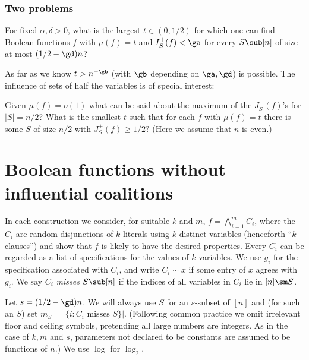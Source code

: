 %
%
%
%
%
%
%
%
%
%
%
%
%
%

%


\subsubsection* {Two problems}


\begin{question}\label{prop4}

For fixed $\alpha,\delta >0$, what is
the largest $t\in (0,1/2)$ for which one can find
Boolean functions $f$ with $\mu(f) =t$ and
$I^+_S(f)<\ga$ for every $S\sub [n]$ of size
at most %
$(1/2-\gd)n$?
\end{question}

\nin
As far as we know $t> n^{-\gb}$ (with $\gb$ depending on $\ga,\gd$)
is possible. The influence of sets of half the variables is of special interest:

\begin{question}\label{prop5}

Given $\mu(f) =o(1)$ what can be said about 
the maximum of
the   %
$J_S^+(f)$'s for $|S|=n/2$?  %
What is the smallest $t$ 
such that for each $f$ with $\mu(f) =t$ there is some
$S$ of size $n/2$ with $J_S^+(f) \ge 1/2 ?$
(Here we assume that $n$ is even.)  %
\end{question}



\section{Boolean functions without influential coalitions}
\label{examples}


In each construction we consider, for suitable $k$ and $m$,
%
$f= \bigwedge_{i=1}^m C_i$, where the  %
%
$C_i$   %
%
%
%
are random %
disjunctions  %
of $k$ literals
using $k$ distinct variables (henceforth ``$k$-clauses'')
and show that $f$ is likely to have the desired properties. 
Every $C_i$ can be regarded as a list of specifications for 
the values of $k$ variables.
We use $g_i$ for the specification associated with $C_i$,
and write $C_i\sim x$ if some entry of $x$ agrees with $g_i$.
We say $C_i$ \emph{misses} $S\sub [n]$ if the indices of all
variables in $C_i$ lie in $[n]\sm S$.


Let $s= (1/2-\gd)n$.  %
We will always
use $S$ for an $s$-subset of $[n]$ and
(for such an $S$) set
$m_S=|\{i:\mbox{$C_i$ misses $S$}\}|.$
(Following common practice we omit irrelevant
floor and ceiling symbols,
pretending all large numbers are integers.
As in the case of $k,m$ and $s$, parameters not declared
to be constants are assumed to be functions of $n$.)
We use $\log$ for $\log_2$.


